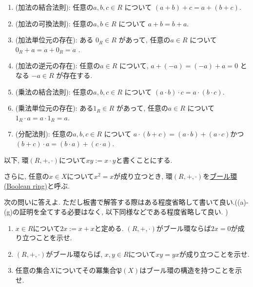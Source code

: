 \documentclass[dvipdfmx,a4paper,11pt]{article}
\theoremstyle{definition}
\begin{document}
\begin{enumerate}[label=\textbf{問}\ref*{sec-1}.\arabic*]
\begin{enumerate}[label=(\alph*).]
 \setlength{\parskip}{0cm}
  \setlength{\itemsep}{0pt}
    \item (加法の結合法則): 任意の\( a, b, c \in R \) について
          $
          (a + b) + c = a + (b + c)
          $.
    \item (加法の可換法則): 任意の\(a,b\in R \) について
          $
          a + b = b + a
          $.
    \item (加法単位元の存在): ある \( 0_R \in R \) があって, 任意の\(a \in  R \) について
          $
          0_R + a = a + 0_R = a
          $ .
    \item (加法の逆元の存在): 任意の\(a \in  R \) について, \( a + (-a) = (-a) + a = 0 \) となる \( -a \in R \) が存在する. 
    \item (乗法の結合法則): 任意の\(a,b,c \in R \) について
          $
          (a \cdot b) \cdot c = a \cdot (b \cdot c)
         $.
    \item (乗法単位元の存在): ある\( 1_R \in R \) があって, 任意の\(a \in R \) について
          $
          1_R \cdot a = a \cdot 1_R = a
          $.
    \item (分配法則): 任意の\(a,b,c \in  R \) について
          $
          a \cdot (b + c) = (a \cdot b) + (a \cdot c)
          $かつ
          $
          (b + c) \cdot a = (b \cdot a) + (c \cdot a)
          $.
\end{enumerate}
以下, 環$(R, +, \cdot) $について$xy:=x \cdot y$と書くことにする. 

さらに, 任意の$x \in X$について$x^2=x$が成り立つとき, 環$(R, +, \cdot) $を\underline{ブール環(Boolean ring)}と呼ぶ.

 次の問いに答えよ. ただし板書で解答する際はある程度省略して書いて良い.((a)-(g)の証明を全てする必要はなく, 以下同様などである程度省略して良い. )
\begin{enumerate}[label=(\arabic*).]
 \setlength{\parskip}{0cm}
  \setlength{\itemsep}{0pt}
  \item $x \in R$について$2x:=x+x$と定める. $(R, +, \cdot) $がブール環ならば$2x=0$が成り立つことを示せ. 
  \item $(R, +, \cdot) $がブール環ならば, $x,y\in R$について$xy=yx$が成り立つことを示せ. 
  \item 任意の集合$X$についてその冪集合$\mathfrak{P}(X)$はブール環の構造を持つことを示せ.
  \end{enumerate}


\end{enumerate}
\end{document}
